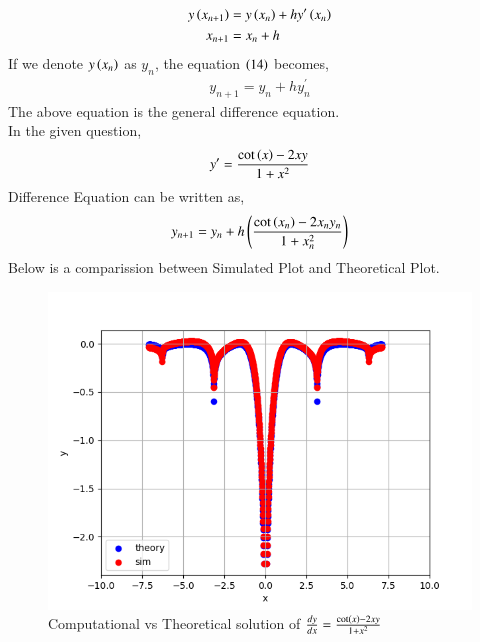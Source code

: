 \documentclass[journal]{IEEEtran}
\begin{document}
\begin{align}  
  y\left(x_{n+1}\right)&=y\left(x_n\right) + h y^{\prime}\left(x_n\right)\\
  x_{n+1}&=x_n+h
\end{align}
If we denote $y\left(x_n\right)$ as $y_n$, the equation $\left(14\right)$ becomes,
\begin{align}
  y_{n+1}=y_n+hy^{\prime}_n
\end{align}
The above equation is the general difference equation.\\

In the given question,
\begin{align}
  y^{\prime}=\frac{\cot\left(x\right)-2xy}{1+x^2}
\end{align}
Difference Equation can be written as,
\begin{align}
  y_{n+1}=y_n+ h \left(\frac{\cot{\ensuremath{\left(x_n\right)}}-2x_ny_n}{1+x_n^2}\right)
\end{align}
Below is a comparission between Simulated Plot and Theoretical Plot.
\begin{figure}[h!]
   \centering
   \includegraphics[width=1\columnwidth]{figs/fig.png}
   \caption{Computational vs Theoretical solution of $ \frac{dy}{dx}= \frac{\cot\left(x\right)-2xy}{1+x^2}$}
   \label{stemplot}
\end{figure}
\end{document}
